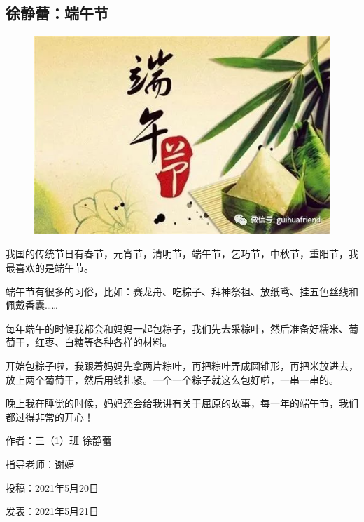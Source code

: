 \vspace{10pt}

{\centering\subsection*{徐静蕾：端午节}}


\renewcommand{\leftmark}{徐静蕾：端午节}

\begin{figure}[htbp]

\centering

\includegraphics[width = .5\textwidth]{./ch/19.jpg}

\end{figure}





我国的传统节日有春节，元宵节，清明节，端午节，乞巧节，中秋节，重阳节，我最喜欢的是端午节。



端午节有很多的习俗，比如：赛龙舟、吃粽子、拜神祭祖、放纸鸢、挂五色丝线和佩戴香囊……

每年端午的时候我都会和妈妈一起包粽子，我们先去采粽叶，然后准备好糯米、葡萄干，红枣、白糖等各种各样的材料。

开始包粽子啦，我跟着妈妈先拿两片粽叶，再把粽叶弄成圆锥形，再把米放进去，放上两个葡萄干，然后用线扎紧。一个一个粽子就这么包好啦，一串一串的。

晚上我在睡觉的时候，妈妈还会给我讲有关于屈原的故事，每一年的端午节，我们都过得非常的开心！





\vspace{10pt}



作者：三（1）班 徐静蕾



指导老师：谢婷



投稿：2021年5月20日



发表：2021年5月21日






                



\vspace{10pt}

\hline



